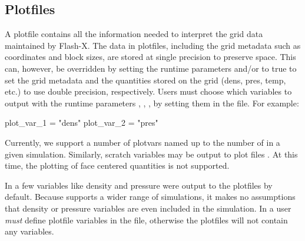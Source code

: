 \subsection{Plotfiles}\label{Sec:Plotfiles}

A plotfile%
contains all the information needed to
interpret the grid data maintained by Flash-X.  The data in plotfiles, 
including the grid metadata such as coordinates and block sizes,
are stored at single precision to preserve space. This can, however, 
be overridden by setting the runtime parameters 
and/or  to true to set the grid metadata and the
quantities stored on the grid (dens, pres, temp, etc.) to use double precision, 
respectively.  Users must choose
which variables to output with the runtime parameters
,
, \etc, by
setting them in the  file.  For example:
\begin{codeseg}
plot_var_1 = "dens"
plot_var_2 = "pres"
\end{codeseg}

Currently, we support a number of plotvars named  
up to the number of  in a given simulation.  Similarly, 
scratch variables may be output to plot files .  At this time, the plotting of 
face centered quantities is not supported.

\begin{flashtip}
In \flashx a few variables like density and pressure were output to the
plotfiles by default.  Because \flashx supports a wider range of
simulations, it makes no assumptions that density or pressure variables
are even included in the simulation.  In \flashx a user \emph{must} define
plotfile variables in the %
 file, otherwise
the plotfiles will not contain any variables.
\end{flashtip}


